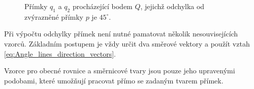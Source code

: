 \begin{example}
\begin{figure}[H]
        \caption{Přímky $q_1$ a $q_2$ procházející bodem $Q$, jejichž
        odchylka od zvýrazněné přímky $p$ je $45^\circ$.}
        \label{fig:Lines_through_point_given_angle}
    \end{figure}
\end{example}


\begin{remark}\label{rem:Summary_angle_between_lines}
    Při výpočtu odchylky přímek není nutné pamatovat několik
    nesouvisejících vzorců. Základním postupem je vždy určit dva
    směrové vektory a použít vztah
    \eqref{eq:Angle_lines_direction_vectors}.

    Vzorce pro obecné rovnice a směrnicové tvary jsou pouze jeho
    upravenými podobami, které umožňují pracovat přímo se zadaným
    tvarem přímek.
\end{remark}
